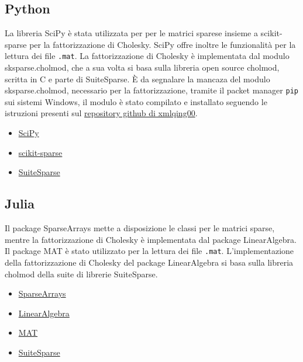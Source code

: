 \documentclass[a4paper, 12pt]{article}
\begin{document}
        \subsection{Python}
            La libreria SciPy è stata utilizzata per per le matrici sparese insieme a scikit-sparse per la 
            fattorizzazione di Cholesky.
            SciPy offre inoltre le funzionalità per la lettura dei file \texttt{.mat}.
            La fattorizzazione di Cholesky è implementata dal modulo sksparse.cholmod, che a sua volta si basa sulla
            libreria open source cholmod, scritta in C e parte di SuiteSparse.
            \`E da segnalare la mancaza del modulo sksparse.cholmod, necessario per la fattorizzazione, tramite il 
            packet manager \texttt{pip} sui sistemi Windows, il modulo è stato compilato e installato seguendo le
            istruzioni presenti sul 
            \href{https://github.com/xmlyqing00/Cholmod-Scikit-Sparse-Windows}{repository github di xmlqing00}.

            \begin{itemize}
                \item \href{https://www.scipy.org/}{SciPy}
                \item \href{https://github.com/scikit-sparse/scikit-sparse} {scikit-sparse}
                \item \href{http://suitesparse.com}{SuiteSparse}
            \end{itemize}

        \subsection{Julia}
            Il package SparseArrays mette a disposizione le classi per le matrici sparse, mentre la fattorizzazione di 
            Cholesky
            è implementata dal package LinearAlgebra.
            Il package MAT è stato utilizzato per la lettura dei file \texttt{.mat}.
            L'implementazione della fattorizzazione di Cholesky del package LinearAlgebra si basa sulla libreria cholmod
            della suite di librerie SuiteSparse.

            \begin{itemize}
                \item \href{https://docs.julialang.org/en/v1/stdlib/SparseArrays/}{SparseArrays}
                \item \href{https://docs.julialang.org/en/v1/stdlib/LinearAlgebra/}{LinearAlgebra}
                \item \href{https://github.com/JuliaIO/MAT.jl}{MAT}
                \item \href{http://suitesparse.com}{SuiteSparse}
            \end{itemize}
\end{document}
